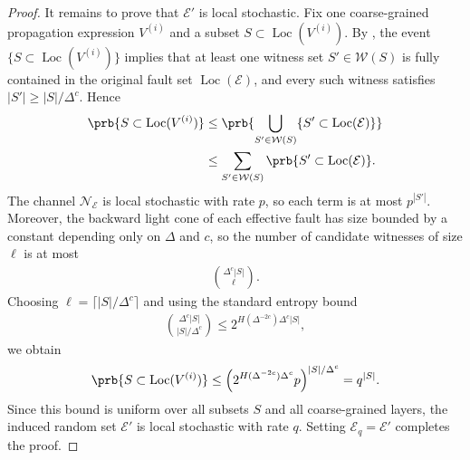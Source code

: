 \begin{proof}
  It remains to prove that $\mathcal{E}'$ is local stochastic. Fix one coarse-grained propagation expression $V^{(i)}$ and a subset $S\subset \operatorname{Loc}(V^{(i)})$. By , the event $\{S\subset \operatorname{Loc}(V^{(i)})\}$ implies that at least one witness set $S'\in \mathcal{W}(S)$ is fully contained in the original fault set $\operatorname{Loc}(\mathcal{E})$, and every such witness satisfies $|S'|\ge |S|/\Delta^{c}$. Hence
  \begin{equation*}
    \begin{split}
      \prb{S\subset \operatorname{Loc}(V^{(i)})}
      &\le
      \prb{\bigcup_{S'\in \mathcal{W}(S)}\{S'\subset \operatorname{Loc}(\mathcal{E})\}} \\
      &\le
      \sum_{S'\in \mathcal{W}(S)} \prb{S'\subset \operatorname{Loc}(\mathcal{E})}.
    \end{split}
  \end{equation*}
  The channel $\mathcal{N}_{\mathcal{E}}$ is local stochastic with rate $p$, so each term is at most $p^{|S'|}$. Moreover, the backward light cone of each effective fault has size bounded by a constant depending only on $\Delta$ and $c$, so the number of candidate witnesses of size $\ell$ is at most
  \begin{equation*}
    \begin{split}
      \binom{\Delta^{c}|S|}{\ell}.
    \end{split}
  \end{equation*}
  Choosing $\ell=\lceil |S|/\Delta^{c}\rceil$ and using the standard entropy bound
  \begin{equation*}
    \begin{split}
      \binom{\Delta^{c}|S|}{|S|/\Delta^{c}}
      \le
      2^{H(\Delta^{-2c})\Delta^{c}|S|},
    \end{split}
  \end{equation*}
  we obtain
  \begin{equation*}
    \begin{split}
      \prb{S\subset \operatorname{Loc}(V^{(i)})}
      \le
      \left(2^{H(\Delta^{-2c})\Delta^{c}}p\right)^{|S|/\Delta^{c}}
      = q^{|S|}.
    \end{split}
  \end{equation*}
  Since this bound is uniform over all subsets $S$ and all coarse-grained layers, the induced random set $\mathcal{E}'$ is local stochastic with rate $q$. Setting $\mathcal{E}_{q}=\mathcal{E}'$ completes the proof.
\end{proof}

